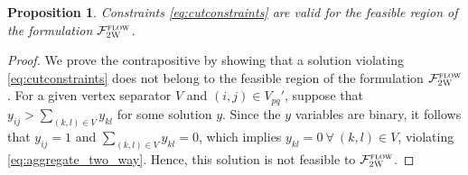 \documentclass[10pt]{article}
\newcommand{\drivevar}[2]{y_{#1#2}}
\newcommand{\entrancex}{p}
\newcommand{\entrancey}{q}
\newcommand{\vertexcutset}{V}
\newcommand{\twowaypartitioncomp}[1]{V_{#1}'}
\newtheorem{proposition}{Proposition}
\theoremstyle{definition}
\begin{document}
\begin{proposition}
\label{prop:2w_disaggregate}
Constraints \eqref{eq:cutconstraints} are valid for the feasible region of the formulation $\mathcal{F}^{\textsc{flow}}_{\textsc{2W}}$.
\end{proposition}
\begin{proof}
We prove the contrapositive by showing that a solution violating \eqref{eq:cutconstraints} does not belong to the feasible region of the formulation $\mathcal{F}^{\textsc{flow}}_{\textsc{2W}}$. For a given vertex separator $\vertexcutset$ and $(i,j) \in \twowaypartitioncomp{\entrancex \entrancey}$, suppose that $\drivevar{i}{j} > \sum_{(k,l) \in \vertexcutset} \drivevar{k}{l}$ for some solution $y$. Since the $y$ variables are binary, it follows that $\drivevar{i}{j} = 1$ and $\sum_{(k,l) \in \vertexcutset} \drivevar{k}{l} = 0$, which implies $\drivevar{k}{l} = 0~\forall~ (k,l) \in \vertexcutset$, violating \eqref{eq:aggregate_two_way}. Hence, this solution is not feasible to $\mathcal{F}^{\textsc{flow}}_{\textsc{2W}}$.    
\end{proof}
\end{document}
